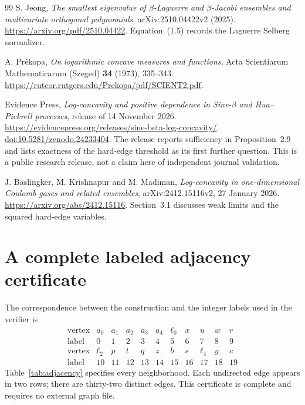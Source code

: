 \documentclass[11pt,a4paper]{article}
\theoremstyle{definition}
\theoremstyle{remark}
\begin{document}
\begin{thebibliography}{99}
S. Jeong,
\emph{The smallest eigenvalue of $\beta$-Laguerre and $\beta$-Jacobi
ensembles and multivariate orthogonal polynomials},
arXiv:2510.04422v2 (2025).
\url{https://arxiv.org/pdf/2510.04422}.
Equation~(1.5) records the Laguerre Selberg normalizer.

A. Pr\'ekopa,
\emph{On logarithmic concave measures and functions},
Acta Scientiarum Mathematicarum (Szeged) \textbf{34} (1973), 335--343.
\url{https://rutcor.rutgers.edu/Prekopa/pdf/SCIENT2.pdf}.

Evidence Press,
\emph{Log-concavity and positive dependence in Sine-$\beta$ and
Hua--Pickrell processes}, release of 14 November 2026.
\url{https://evidencepress.org/releases/sine-beta-log-concavity/}.
\href{https://doi.org/10.5281/zenodo.24233404}{doi:10.5281/zenodo.24233404}.
The release reports sufficiency in Proposition~2.9 and lists
exactness of the hard-edge threshold as its first further question.
This is a public research release, not a claim here of independent
journal validation.

J. Baslingker, M. Krishnapur and M. Madiman,
\emph{Log-concavity in one-dimensional Coulomb gases and related ensembles},
arXiv:2412.15116v2, 27 January 2026.
\url{https://arxiv.org/abs/2412.15116}.
Section~3.1 discusses weak limits and the squared hard-edge variables.

\end{thebibliography}


\clearpage
\appendix
\section{A complete labeled adjacency certificate}
\label{app:adjacency}

The correspondence between the construction and the integer labels
used in the verifier is
\[
\begin{array}{c|rrrrrrrrrr}
\text{vertex}&a_0&a_1&a_2&a_3&a_4&\ell_0&x&u&w&r\\
\text{label}&0&1&2&3&4&5&6&7&8&9\\ \hline
\text{vertex}&\ell_2&p&t&q&z&b&s&\ell_4&y&c\\
\text{label}&10&11&12&13&14&15&16&17&18&19
\end{array}
\]
Table~\ref{tab:adjacency} specifies every neighborhood. Each
undirected edge appears in two rows; there are thirty-two distinct
edges. This certificate is complete and requires no external graph
file.
\end{document}
